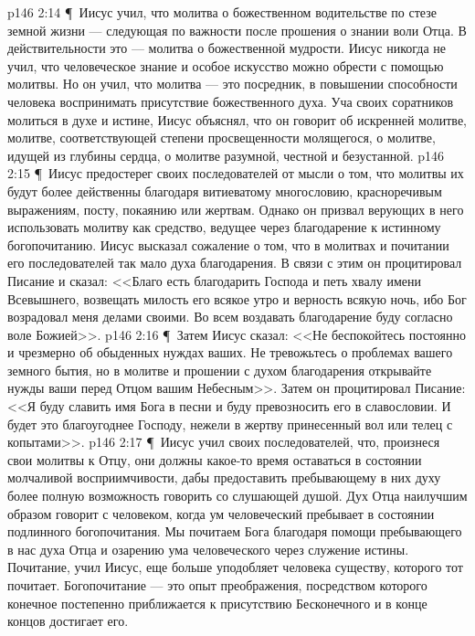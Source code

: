 \vs p146 2:14 \P\ \bibnobreakspace Иисус учил, что молитва о божественном водительстве по стезе земной жизни --- следующая по важности после прошения о знании воли Отца. В действительности это --- молитва о божественной мудрости. Иисус никогда не учил, что человеческое знание и особое искусство можно обрести с помощью молитвы. Но он учил, что молитва --- это посредник, в повышении способности человека воспринимать присутствие божественного духа. Уча своих соратников молиться в духе и истине, Иисус объяснял, что он говорит об искренней молитве, молитве, соответствующей степени просвещенности молящегося, о молитве, идущей из глубины сердца, о молитве разумной, честной и безустанной.
\vs p146 2:15 \P\ \bibnobreakspace Иисус предостерег своих последователей от мысли о том, что молитвы их будут более действенны благодаря витиеватому многословию, красноречивым выражениям, посту, покаянию или жертвам. Однако он призвал верующих в него использовать молитву как средство, ведущее через благодарение к истинному богопочитанию. Иисус высказал сожаление о том, что в молитвах и почитании его последователей так мало духа благодарения. В связи с этим он процитировал Писание и сказал: <<Благо есть благодарить Господа и петь хвалу имени Всевышнего, возвещать милость его всякое утро и верность всякую ночь, ибо Бог возрадовал меня делами своими. Во всем воздавать благодарение буду согласно воле Божией>>.
\vs p146 2:16 \P\ \bibnobreakspace Затем Иисус сказал: <<Не беспокойтесь постоянно и чрезмерно об обыденных нуждах ваших. Не тревожьтесь о проблемах вашего земного бытия, но в молитве и прошении с духом благодарения открывайте нужды ваши перед Отцом вашим Небесным>>. Затем он процитировал Писание: <<Я буду славить имя Бога в песни и буду превозносить его в славословии. И будет это благоугоднее Господу, нежели в жертву принесенный вол или телец с копытами>>.
\vs p146 2:17 \P\ \bibnobreakspace Иисус учил своих последователей, что, произнеся свои молитвы к Отцу, они должны какое\hyp{}то время оставаться в состоянии молчаливой восприимчивости, дабы предоставить пребывающему в них духу более полную возможность говорить со слушающей душой. Дух Отца наилучшим образом говорит с человеком, когда ум человеческий пребывает в состоянии подлинного богопочитания. Мы почитаем Бога благодаря помощи пребывающего в нас духа Отца и озарению ума человеческого через служение истины. Почитание, учил Иисус, еще больше уподобляет человека существу, которого тот почитает. Богопочитание --- это опыт преображения, посредством которого конечное постепенно приближается к присутствию Бесконечного и в конце концов достигает его.
